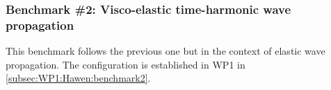 
\subsubsection{Benchmark \#2: Visco-elastic time-harmonic wave propagation}
\label{subsec:WP3:Hawen:benchmark2}

This benchmark follows the previous one but in the context of 
elastic wave propagation. The configuration is 
established in WP1 in \cref{subsec:WP1:Hawen:benchmark2}.

